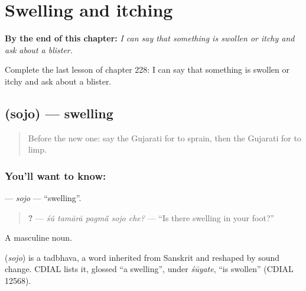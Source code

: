 
\chapter{Swelling and itching}
\label{ch:gu-swelling-and-itching}

\begin{chapteropening}
\textbf{By the end of this chapter:} \emph{I can say that something is swollen or itchy and ask about a blister.}

Complete the last lesson of chapter 228: I can say that something is swollen or itchy and ask about a blister.
\end{chapteropening}

\section[\texorpdfstring{\gu{સોજો} (sojo)}{સોજો (sojo)}]{ (sojo) — swelling}

\label{lesson:GU-C228-sojo}



\begin{quote}
Before the new one: say the Gujarati for to sprain, then the Gujarati for to limp.
\end{quote}

\subsection*{You'll want to know: }
\textbf{} — \emph{sojo} — \textquotedblleft{}swelling\textquotedblright{}.

\begin{quote}
\textbf{    ?} — \emph{śũ tamārā pagmā̃ sojo che?} — \textquotedblleft{}Is there swelling in your foot?\textquotedblright{}
\end{quote}

A masculine noun.

\begin{cousinweb}
\textbf{} (\emph{sojo}) is a tadbhava, a word inherited from Sanskrit and reshaped by sound change. CDIAL lists it, glossed \textquotedblleft{}a swelling\textquotedblright{}, under \emph{śūyate}, \textquotedblleft{}is swollen\textquotedblright{} (CDIAL 12568).
\end{cousinweb}


